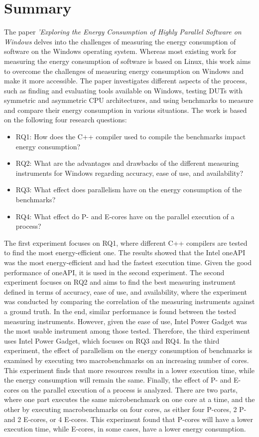 \section*{Summary}

The paper \textit{'Exploring the Energy Consumption of Highly Parallel Software on Windows} delves into the challenges of measuring the energy consumption of software on the Windows operating system. Whereas most existing work for measuring the energy consumption of software is based on Linux, this work aims to overcome the challenges of measuring energy consumption on Windows and make it more accessible. The paper investigates different aspects of the process, such as finding and evaluating tools available on Windows, testing DUTs with symmetric and asymmetric CPU architectures, and using benchmarks to measure and compare their energy consumption in various situations. The work is based on the following four research questions:

\begin{itemize}
    \item RQ1: How does the C++ compiler used to compile the benchmarks impact energy consumption?
    \item RQ2: What are the advantages and drawbacks of the different measuring instruments for Windows regarding accuracy, ease of use, and availability?
    \item RQ3: What effect does parallelism have on the energy consumption of the benchmarks?
    \item RQ4: What effect do P- and E-cores have on the parallel execution of a process?
\end{itemize}

The first experiment focuses on RQ1, where different C++ compilers are tested to find the most energy-efficient one. The results showed that the Intel oneAPI was the most energy-efficient and had the fastest execution time. Given the good performance of oneAPI, it is used in the second experiment. The second experiment focuses on RQ2 and aims to find the best measuring instrument defined in terms of accuracy, ease of use, and availability, where the experiment was conducted by comparing the correlation of the measuring instruments against a ground truth. In the end, similar performance is found between the tested measuring instruments. However, given the ease of use, Intel Power Gadget was the most usable instrument among those tested. Therefore, the third experiment uses Intel Power Gadget, which focuses on RQ3 and RQ4. In the third experiment, the effect of parallelism on the energy consumption of benchmarks is examined by executing two macrobenchmarks on an increasing number of cores. This experiment finds that more resources results in a lower execution time, while the energy consumption will remain the same. Finally, the effect of P- and E-cores on the parallel execution of a process is analyzed. There are two parts, where one part executes the same microbenchmark on one core at a time, and the other by executing macrobenchmarks on four cores, as either four P-cores, 2 P- and 2 E-cores, or 4 E-cores. This experiment found that P-cores will have a lower execution time, while E-cores, in some cases, have a lower energy consumption.

